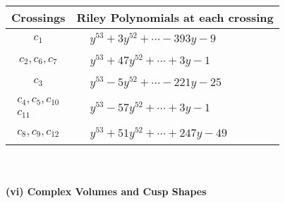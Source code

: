 \documentclass[1p]{elsarticle_modified}
\theoremstyle{definition}
\begin{document}
\begin{tabular}{m{50pt}|m{274pt}}
Crossings & \hspace{64pt}Riley Polynomials at each crossing \\
\hline $$\begin{aligned}c_{1}\end{aligned}$$&$\begin{aligned}
&y^{53}+3 y^{52}+\cdots-393 y-9
\end{aligned}$\\
\hline $$\begin{aligned}c_{2},c_{6},c_{7}\end{aligned}$$&$\begin{aligned}
&y^{53}+47 y^{52}+\cdots+3 y-1
\end{aligned}$\\
\hline $$\begin{aligned}c_{3}\end{aligned}$$&$\begin{aligned}
&y^{53}-5 y^{52}+\cdots-221 y-25
\end{aligned}$\\
\hline $$\begin{aligned}c_{4},c_{5},c_{10}\\c_{11}\end{aligned}$$&$\begin{aligned}
&y^{53}-57 y^{52}+\cdots+3 y-1
\end{aligned}$\\
\hline $$\begin{aligned}c_{8},c_{9},c_{12}\end{aligned}$$&$\begin{aligned}
&y^{53}+51 y^{52}+\cdots+247 y-49
\end{aligned}$\\
\hline
\end{tabular}\\~\\
\newpage\flushleft \textbf{(vi) Complex Volumes and Cusp Shapes}
\end{document}
